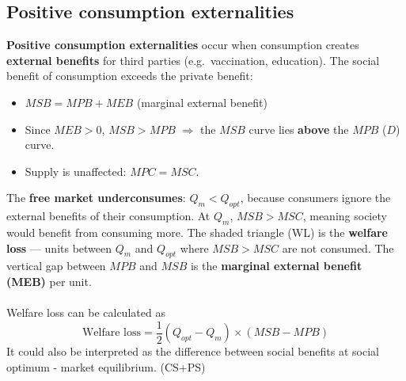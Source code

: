 \documentclass[a4paper,12pt]{article}
\begin{document}
\subsection{Positive consumption externalities}
\textbf{Positive consumption externalities} occur when consumption creates \textbf{external benefits} for third parties (e.g.\ vaccination, education). The social benefit of consumption exceeds the private benefit:
\begin{itemize}
  \item $MSB = MPB + MEB$ (marginal external benefit)
  \item Since $MEB > 0$, $MSB > MPB$ $\Rightarrow$ the $MSB$ curve lies \textbf{above} the $MPB$ ($D$) curve.
  \item Supply is unaffected: $MPC = MSC$.
\end{itemize}

\begin{center}
\end{center}
The \textbf{free market underconsumes}: $Q_m < Q_{opt}$, because consumers ignore the external benefits of their consumption. At $Q_m$, $MSB > MSC$, meaning society would benefit from consuming more. The shaded triangle (WL) is the \textbf{welfare loss} --- units between $Q_m$ and $Q_{opt}$ where $MSB > MSC$ are not consumed. The vertical gap between $MPB$ and $MSB$ is the \textbf{marginal external benefit (MEB)} per unit.\\\\
Welfare loss can be calculated as 
\[\text{Welfare loss}=\dfrac{1}{2}(Q_{opt}-Q_m)\times (MSB-MPB)\]
It could also be interpreted as the difference between social benefits at social optimum - market equilibrium. (CS+PS)
\end{document}
